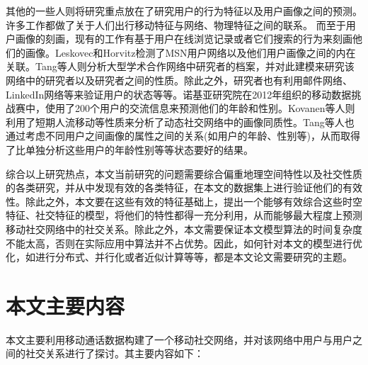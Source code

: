其他的一些人则将研究重点放在了研究用户的行为特征以及用户画像之间的预测。许多工作都做了关于人们出行移动特征与网络、物理特征之间的联系。 而至于用户画像的刻画，现有的工作有基于用户在线浏览记录或者它们搜索的行为来刻画他们的画像。Leskovec和Horvitz检测了MSN用户网络以及他们用户画像之间的内在关联。Tang等人则分析大型学术合作网络中研究者的档案，并对此建模来研究该网络中的研究者以及研究者之间的性质。除此之外，研究者也有利用邮件网络、LinkedIn网络等来验证用户的状态等等。诺基亚研究院在2012年组织的移动数据挑战赛中，使用了200个用户的交流信息来预测他们的年龄和性别。Kovanen等人则利用了短期人流移动等性质来分析了动态社交网络中的画像同质性。Tang等人也通过考虑不同用户之间画像的属性之间的关系(如用户的年龄、性别等)，从而取得了比单独分析这些用户的年龄性别等等状态要好的结果。


综合以上研究热点，本文当前研究的问题需要综合偏重地理空间特性以及社交性质的各类研究，并从中发现有效的各类特征，在本文的数据集上进行验证他们的有效性。除此之外，本文要在这些有效的特征基础上，提出一个能够有效综合这些时空特征、社交特征的模型，将他们的特性都得一充分利用，从而能够最大程度上预测移动社交网络中的社交关系。除此之外，本文需要保证本文模型算法的时间复杂度不能太高，否则在实际应用中算法并不占优势。因此，如何针对本文的模型进行优化，如进行分布式、并行化或者近似计算等等，都是本文论文需要研究的主题。







\section{本文主要内容}

本文主要利用移动通话数据构建了一个移动社交网络，并对该网络中用户与用户之间的社交关系进行了探讨。其主要内容如下：

